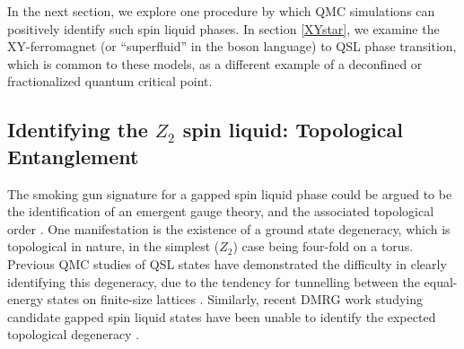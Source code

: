 \documentclass[range]{ar2e}
\begin{document}


In the next section, we explore one procedure by which QMC simulations can positively identify such spin liquid phases.  In section \ref{XYstar}, we examine the XY-ferromagnet (or ``superfluid'' in the boson language) to QSL phase transition, which is common to these models, as a different example of a deconfined or fractionalized quantum critical point.

\subsection{Identifying the $Z_2$ spin liquid: Topological Entanglement} 
\label{topoEEsec}

The smoking gun signature for a gapped spin liquid phase could be argued to be the identification of an emergent gauge theory,
and the associated topological order \cite{Wenbook}.  One manifestation is the existence of a ground state degeneracy, which is topological in nature, in the simplest ($Z_2$) case being four-fold on a torus.  Previous QMC studies of QSL states have demonstrated the difficulty in clearly identifying this degeneracy, due to the tendency for tunnelling between the equal-energy states on finite-size lattices \cite{Isakov1}.  Similarly, recent DMRG work studying candidate gapped spin liquid states have been unable to identify the expected topological degeneracy \cite{Yan,J1J2}.
\end{document}
